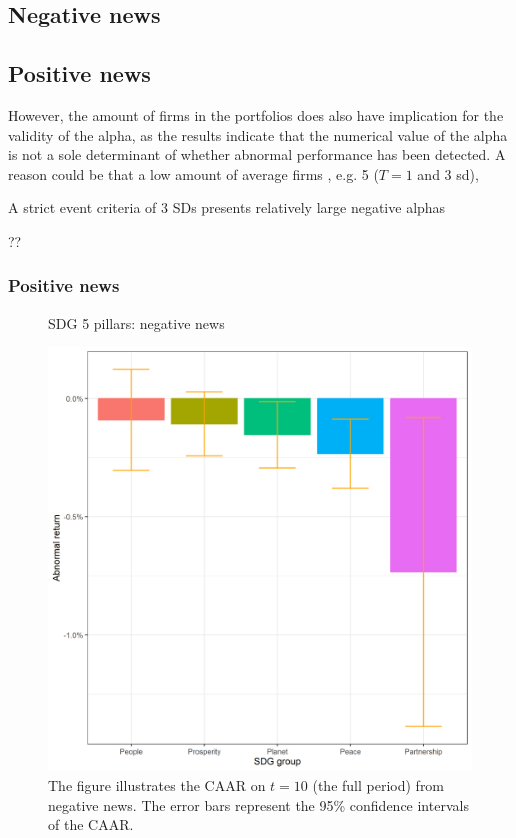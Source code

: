 \subsection{Negative news}

\subsection{Positive news}


  However, the amount of firms in the portfolios does also have implication for the validity of the alpha, as the results indicate that the numerical value of the alpha is not a sole determinant of whether abnormal performance has been detected. A reason could be that a low amount of average firms , e.g. 5 ($T = 1$ and 3 sd), 

A strict event criteria of 3 SDs presents relatively large negative alphas

  ??

  \subsubsection{Positive news}




\begin{figure} [H]
    \centering
    \caption{SDG 5 pillars: negative news}
    \includegraphics[scale=0.6]{Projekt/1.Figures analysis/ST_negative_sdg_bar_groups_0.png}
    \caption*{\footnotesize The figure illustrates the CAAR on $t = 10$ (the full period) from negative news. The error bars represent the 95\% confidence intervals of the CAAR.}
    \label{fig:ST_neg_bar}
\end{figure}



